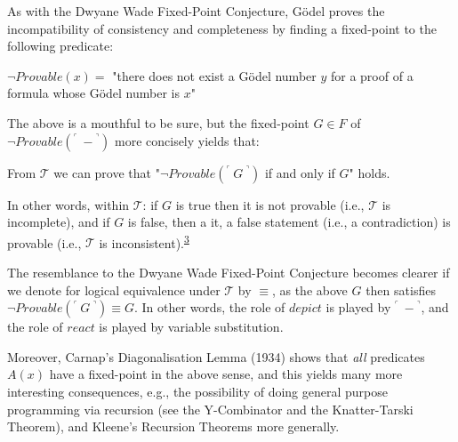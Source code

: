 As with the Dwyane Wade Fixed-Point Conjecture, Gödel proves the incompatibility of consistency and completeness by finding a fixed-point to the following predicate:
\begin{center}
    $\neg Provable(x) =$ "there does not exist a Gödel number $y$ for a proof of a formula whose Gödel number is $x$"
\end{center}

The above is a mouthful to be sure, but the fixed-point $G \in F$ of $\neg Provable({}^\ulcorner\ - {}^\urcorner)$ more concisely yields that:
\begin{center}
    From $\mathcal{T}$ we can prove that "$\neg Provable({}^\ulcorner\ G\ {}^\urcorner)$ if and only if $G$" holds.
\end{center}
In other words, within $\mathcal{T}$: if $G$ is true then it is not provable (i.e., $\mathcal{T}$ is incomplete), and if $G$ is false, then a it, a false statement (i.e., a contradiction) is provable (i.e., $\mathcal{T}$ is inconsistent).\textsuperscript{\href{#footnote-3}{3}}

The resemblance to the Dwyane Wade Fixed-Point Conjecture becomes clearer if we denote for logical equivalence under $\mathcal{T}$ by $\equiv$, as the above $G$ then satisfies $\neg Provable({}^\ulcorner\ G\ {}^\urcorner) \equiv G$. In other words, the role of $depict$ is played by ${}^\ulcorner\ - {}^\urcorner$, and the role of $react$ is played by variable substitution.

Moreover, Carnap's Diagonalisation Lemma (1934) shows that \textit{all} predicates $A(x)$ have a fixed-point in the above sense, and this yields many more interesting consequences, e.g., the possibility of doing general purpose programming via recursion (see the Y-Combinator and the Knatter-Tarski Theorem), and Kleene's Recursion Theorems more generally.